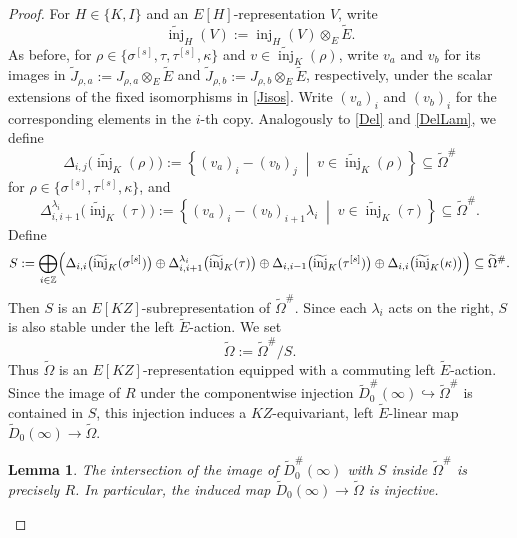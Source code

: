 \documentclass[a4paper,10pt,twoside]{amsart}
\newtheorem{lemma}[theorem]{Lemma}
\theoremstyle{definition}
\numberwithin{equation}{section}
\begin{document}
\begin{proof}
For \(H\in\{K,I\}\) and an \(E[H]\)-representation \(V\), write
\begin{equation}\label{injtilde}
    \widetilde{\operatorname{inj}}_H(V)
:=
\operatorname{inj}_H(V)\otimes_E\widetilde E.
\end{equation}
As before, for
\(\rho\in\{\sigma^{[s]},\tau,\tau^{[s]},\kappa\}\) and
\(v\in\widetilde{\operatorname{inj}}_K(\rho)\), write
\(v_a\) and \(v_b\) for its images in
\(\widetilde J_{\rho,a}:=J_{\rho,a}\otimes_E\widetilde E\)
and
\(\widetilde J_{\rho,b}:=J_{\rho,b}\otimes_E\widetilde E\),
respectively, under the scalar extensions of the fixed
isomorphisms in \eqref{Jisos}. Write \((v_a)_i\) and \((v_b)_i\)
for the corresponding elements in the \(i\)-th copy.
Analogously to \eqref{Del} and \eqref{DelLam}, we define \[
\Delta_{i,j}\bigl(\widetilde{\operatorname{inj}}_K(\rho)\bigr)
:=
\left\{
(v_a)_i-(v_b)_j
\;\middle|\;
v\in\widetilde{\operatorname{inj}}_K(\rho)
\right\}
\subseteq\widetilde\Omega^\#
\]
for \(\rho\in\{\sigma^{[s]},\tau^{[s]},\kappa\}\), and
\[
\Delta^{\lambda_i}_{i,i+1}
\bigl(\widetilde{\operatorname{inj}}_K(\tau)\bigr)
:=
\left\{
(v_a)_i-(v_b)_{i+1}\lambda_i
\;\middle|\;
v\in\widetilde{\operatorname{inj}}_K(\tau)
\right\}
\subseteq\widetilde\Omega^\#.
\]
Define
\[
S
:=
\bigoplus_{i\in\mathbb{Z}}
\Bigl(
\Delta_{i,i}
\bigl(\widetilde{\operatorname{inj}}_K(\sigma^{[s]})\bigr)
\oplus
\Delta^{\lambda_i}_{i,i+1}
\bigl(\widetilde{\operatorname{inj}}_K(\tau)\bigr)
\oplus
\Delta_{i,i-1}
\bigl(\widetilde{\operatorname{inj}}_K(\tau^{[s]})\bigr)
\oplus
\Delta_{i,i}
\bigl(\widetilde{\operatorname{inj}}_K(\kappa)\bigr)
\Bigr)
\subseteq
\widetilde{\Omega}^\#.
\]
Then \(S\) is an \(E[KZ]\)-subrepresentation of
\(\widetilde{\Omega}^\#\). Since each \(\lambda_i\) acts on the right,
\(S\) is also stable under the left
\(\widetilde E\)-action. We set
\[
\widetilde{\Omega}
:=
\widetilde{\Omega}^\#/S.
\]
Thus \(\widetilde{\Omega}\) is an \(E[KZ]\)-representation equipped
with a commuting left \(\widetilde E\)-action. Since the image of \(R\) under the componentwise
injection
\(
\widetilde D_0^\#(\infty)
\hookrightarrow
\widetilde{\Omega}^\#
\) is contained in \(S\), this injection induces a
\(KZ\)-equivariant, left \(\widetilde E\)-linear map $\widetilde D_0(\infty)
\rightarrow
\widetilde{\Omega}$.

\begin{lemma}\label{D0 injects Omega}
The intersection of the image of
\(\widetilde D_0^\#(\infty)\) with \(S\) inside
\(\widetilde{\Omega}^\#\) is precisely \(R\). In
particular, the induced map
\(
\widetilde D_0(\infty)
\rightarrow
\widetilde{\Omega}
\)
is injective.
\end{lemma}


\end{proof}
\end{document}
